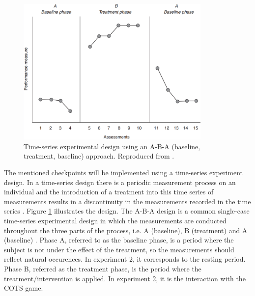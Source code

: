 \begin{figure}[ht]
    \centering
    \includegraphics[width=0.85\textwidth]{figures/time-series-design-breakwell.png}
    \caption{Time-series experimental design using an A-B-A (baseline, treatment, baseline) approach. Reproduced from \textcite{breakwell1994research}.}
    \label{fig:time-series-design-breakwell}
\end{figure}

The mentioned checkpoints will be implemented using a time-series experiment design. In a time-series design there is a periodic measurement process on an individual and the introduction of a treatment into this time series of measurements results in a discontinuity in the measurements recorded in the time series \parencite{campbell2015experimental}. Figure \ref{fig:time-series-design-breakwell} illustrates the design. The A-B-A design is a common single-case time-series experimental design in which the measurements are conducted throughout the three parts of the process, i.e. A (baseline), B (treatment) and A (baseline) \parencite{robson2016real}. Phase A, referred to as the baseline phase, is a period where the subject is not under the effect of the treatment, so the measurements should reflect natural occurences. In experiment 2, it corresponds to the resting period. Phase B, referred as the treatment phase, is the period where the treatment/intervention is applied. In experiment 2, it is the interaction with the COTS game.

